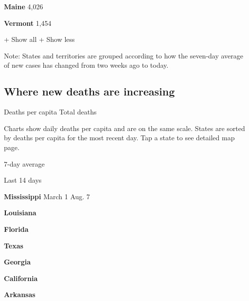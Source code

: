\textbf{Maine} 4,026

\href{https://www.nytimes.com/interactive/2020/us/vermont-coronavirus-cases.html}{}

\textbf{Vermont} 1,454

+ Show all + Show less

Note: States and territories are grouped according to how the seven-day
average of new cases has changed from two weeks ago to today.

\hypertarget{where-new-deaths-are-increasing}{%
\subsection{Where new deaths are
increasing}\label{where-new-deaths-are-increasing}}

Deaths per capita Total deaths

Charts show daily deaths per capita and are on the same scale. States
are sorted by deaths per capita for the most recent day. Tap a state to
see detailed map page.

\href{https://www.nytimes.com/interactive/2020/us/mississippi-coronavirus-cases.html}{}

7-day average

Last 14 days

\textbf{Mississippi} March 1 Aug. 7

\href{https://www.nytimes.com/interactive/2020/us/louisiana-coronavirus-cases.html}{}

\textbf{Louisiana}

\href{https://www.nytimes.com/interactive/2020/us/florida-coronavirus-cases.html}{}

\textbf{Florida}

\href{https://www.nytimes.com/interactive/2020/us/texas-coronavirus-cases.html}{}

\textbf{Texas}

\href{https://www.nytimes.com/interactive/2020/us/georgia-coronavirus-cases.html}{}

\textbf{Georgia}

\href{https://www.nytimes.com/interactive/2020/us/california-coronavirus-cases.html}{}

\textbf{California}

\href{https://www.nytimes.com/interactive/2020/us/arkansas-coronavirus-cases.html}{}

\textbf{Arkansas}

\href{https://www.nytimes.com/interactive/2020/us/idaho-coronavirus-cases.html}{}


